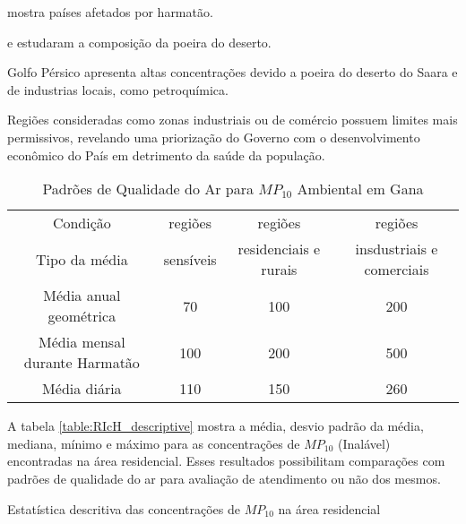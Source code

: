 \cite{prospero2002} mostra países afetados por harmatão. 

\cite{engelbrecht2009a} e \citep{engelbrecht2009b} estudaram a composição 
da poeira do deserto.

\citep{kaku2016} Golfo Pérsico apresenta altas concentrações devido a poeira do 
deserto do Saara e de industrias locais, como petroquímica. 

Regiões consideradas como zonas
industriais ou de comércio possuem limites mais permissivos, revelando 
uma priorização do Governo com o desenvolvimento econômico do País em 
detrimento da saúde da população.

\begin{table}[H]
\centering
\begin{tabular}{cccc}
\hline
Condição                      &   regiões  &        regiões       &         regiões               \\
Tipo da média                 & sensíveis & residenciais e rurais & insdustriais e comerciais      \\
\hline
Média anual geométrica        & 70              & 100                      & 200                   \\
Média mensal durante Harmatão & 100             & 200                      & 500                     \\
Média diária                  & 110             & 150                      & 260         \\               
\hline
\end{tabular}
\caption{Padrões de Qualidade do Ar para $MP_{10}$ Ambiental em Gana
         \cite{epa2015} \label{table:padroesgana}}
\end{table}

A tabela \ref{table:RIcH_descriptive} mostra a média, desvio padrão da média,
mediana, mínimo e máximo para as concentrações de $MP_{10}$ (Inalável) 
encontradas na área residencial. Esses resultados possibilitam comparações com 
padrões de qualidade do ar para avaliação de atendimento ou não dos mesmos.    

\begin{table}[H]
  \centering
    
  \caption{Estatística descritiva das concentrações de  $MP_{10}$ na área 
           residencial \label{table:RIcH_descriptive}}
\end{table}

